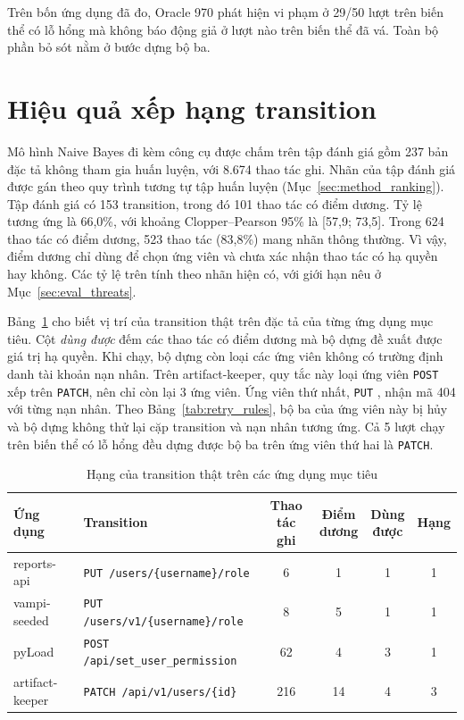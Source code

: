 Trên bốn ứng dụng đã đo, Oracle 970 phát hiện vi phạm ở 29/50 lượt trên biến thể có lỗ hổng mà không báo động giả ở lượt nào trên biến thể đã vá. Toàn bộ phần bỏ sót nằm ở bước dựng bộ ba.

\section{Hiệu quả xếp hạng transition}
\label{sec:eval_ranking}

Mô hình Naive Bayes đi kèm công cụ được chấm trên tập đánh giá gồm 237 bản đặc tả không tham gia huấn luyện, với 8.674 thao tác ghi. Nhãn của tập đánh giá được gán theo quy trình tương tự tập huấn luyện (Mục~\ref{sec:method_ranking}). Tập đánh giá có 153 transition, trong đó 101 thao tác có điểm dương. Tỷ lệ tương ứng là 66,0\%, với khoảng Clopper--Pearson 95\% là [57,9; 73,5]. Trong 624 thao tác có điểm dương, 523 thao tác (83,8\%) mang nhãn thông thường. Vì vậy, điểm dương chỉ dùng để chọn ứng viên và chưa xác nhận thao tác có hạ quyền hay không. Các tỷ lệ trên tính theo nhãn hiện có, với giới hạn nêu ở Mục~\ref{sec:eval_threats}.

Bảng~\ref{tab:rank_targets} cho biết vị trí của transition thật trên đặc tả của từng ứng dụng mục tiêu. Cột \emph{dùng được} đếm các thao tác có điểm dương mà bộ dựng đề xuất được giá trị hạ quyền. Khi chạy, bộ dựng còn loại các ứng viên không có trường định danh tài khoản nạn nhân. Trên artifact-keeper, quy tắc này loại ứng viên \texttt{POST}  xếp trên \texttt{PATCH}, nên chỉ còn lại 3 ứng viên. Ứng viên thứ nhất, \texttt{PUT} , nhận mã 404 với từng nạn nhân. Theo Bảng~\ref{tab:retry_rules}, bộ ba của ứng viên này bị hủy và bộ dựng không thử lại cặp transition và nạn nhân tương ứng. Cả 5 lượt chạy trên biến thể có lỗ hổng đều dựng được bộ ba trên ứng viên thứ hai là \texttt{PATCH}.

\begin{table}[htbp]
  \centering
  \caption{Hạng của transition thật trên các ứng dụng mục tiêu}
  \label{tab:rank_targets}
  \small
  \begin{tabularx}{\textwidth}{@{}l >{\raggedright\arraybackslash}X c c c c@{}}
    \toprule
    Ứng dụng & Transition & \makecell[b]{Thao tác\\ghi} & \makecell[b]{Điểm\\dương} & \makecell[b]{Dùng\\được} & Hạng \\
    \midrule
    reports-api & \texttt{PUT /users/\{username\}/role} & 6 & 1 & 1 & 1 \\
    vampi-seeded & \texttt{PUT /users/v1/\{username\}/role} & 8 & 5 & 1 & 1 \\
    pyLoad & \texttt{POST /api/set\_user\_permission} & 62 & 4 & 3 & 1 \\
    artifact-keeper & \texttt{PATCH /api/v1/users/\{id\}} & 216 & 14 & 4 & 3 \\
    \bottomrule
  \end{tabularx}
\end{table}

